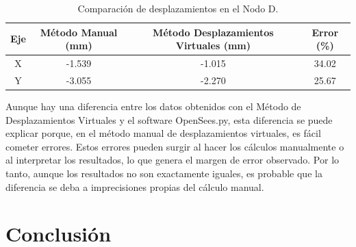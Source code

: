 \documentclass{article}  %
\begin{document}
\begin{table}[h!]
  \centering
  \begin{tabular}{cccc}
  \hline
  \textbf{Eje} & \textbf{Método Manual (mm)} & \textbf{ Método Desplazamientos Virtuales (mm)} & \textbf{Error (\%)} \\
  \hline
  X & -1.539 & -1.015 & 34.02\\
  Y & -3.055 & -2.270 & 25.67\\
  \hline
  \end{tabular}
  \caption{Comparación de desplazamientos en el Nodo D.}
\end{table}

Aunque hay una diferencia entre los datos obtenidos con el Método de Desplazamientos Virtuales y el software OpenSees.py, esta diferencia se puede explicar porque, en el método manual de desplazamientos virtuales, es fácil cometer errores. Estos errores pueden surgir al hacer los cálculos manualmente o al interpretar los resultados, lo que genera el margen de error observado. Por lo tanto, aunque los resultados no son exactamente iguales, es probable que la diferencia se deba a imprecisiones propias del cálculo manual.

\newpage

\section{Conclusión}
\end{document}
